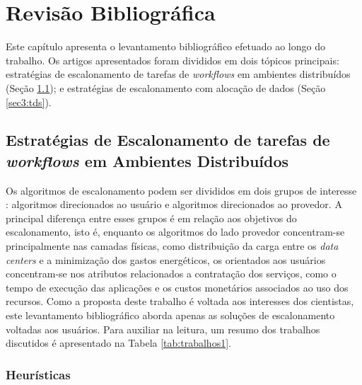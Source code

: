 \chapter{Revisão Bibliográfica}\label{chap3}

Este capítulo apresenta o levantamento bibliográfico efetuado ao longo do trabalho. Os artigos apresentados foram divididos em dois tópicos principais: estratégias de escalonamento de tarefas de \textit{workflows} em 
ambientes distribuídos (Seção \ref{sec3:ws});  e estratégias de escalonamento com alocação de dados (Seção \ref{sec3:tds}).  

\section{Estratégias de Escalonamento de tarefas de \textit{workflows} em Ambientes Distribuídos}\label{sec3:ws}

Os algoritmos de escalonamento podem ser divididos em dois grupos de interesse \cite{Smanchat}: algoritmos direcionados ao usuário e algoritmos direcionados ao provedor. A principal diferença entre esses grupos é em relação aos objetivos do escalonamento, isto é, enquanto os algoritmos do lado provedor concentram-se principalmente nas camadas físicas, como distribuição da carga entre os \textit{data centers} e a minimização dos gastos energéticos, os orientados aos usuários concentram-se nos atributos relacionados a contratação dos serviços, como o tempo de execução das aplicações e os custos monetários associados ao uso dos recursos. Como a proposta deste trabalho é voltada aos interesses dos cientistas, este levantamento bibliográfico aborda apenas as soluções de escalonamento voltadas aos usuários. Para auxiliar na leitura, um resumo dos trabalhos discutidos é apresentado na Tabela \ref{tab:trabalhos1}.


\subsection{Heurísticas}

